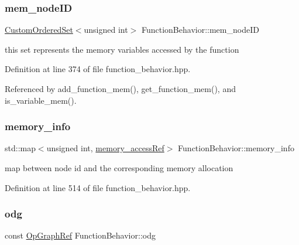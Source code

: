 \subsubsection{\texorpdfstring{mem\+\_\+node\+ID}{mem\_nodeID}}
{\footnotesize\ttfamily \hyperlink{classCustomOrderedSet}{Custom\+Ordered\+Set}$<$unsigned int$>$ Function\+Behavior\+::mem\+\_\+node\+ID\hspace{0.3cm}{\ttfamily [private]}}



this set represents the memory variables accessed by the function 



Definition at line 374 of file function\+\_\+behavior.\+hpp.



Referenced by add\+\_\+function\+\_\+mem(), get\+\_\+function\+\_\+mem(), and is\+\_\+variable\+\_\+mem().

\mbox{\label{classFunctionBehavior_a43f47c383d2e236f57ae91c3c0339a69}} 
\subsubsection{\texorpdfstring{memory\+\_\+info}{memory\_info}}
{\footnotesize\ttfamily std\+::map$<$unsigned int, \hyperlink{function__behavior_8hpp_a37eb6f6bc2e166d30cc3ff2ee214d886}{memory\+\_\+access\+Ref}$>$ Function\+Behavior\+::memory\+\_\+info}



map between node id and the corresponding memory allocation 



Definition at line 514 of file function\+\_\+behavior.\+hpp.

\mbox{\label{classFunctionBehavior_a906f25f24348a95251c279809e36115f}} 
\subsubsection{\texorpdfstring{odg}{odg}}
{\footnotesize\ttfamily const \hyperlink{op__graph_8hpp_aee97c95c40f791b60c451d9e29c72d39}{Op\+Graph\+Ref} Function\+Behavior\+::odg\hspace{0.3cm}{\ttfamily [private]}}



